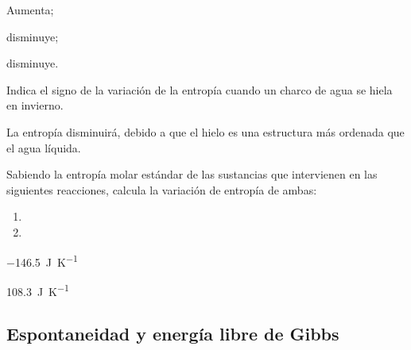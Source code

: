   \begin{solution}
    \begin{enumerate*}
      \item Aumenta;
      \item disminuye;
      \item disminuye.
    \end{enumerate*}
  \end{solution}



  \begin{exercise}[
      tags    = {termodinámica, entropía},
      topics  = {química, termoquímica, termodinámica},
      source  = {},
    ]
    Indica el signo de la variación de la entropía cuando un charco de agua se hiela en invierno.
  \end{exercise}

  \begin{solution}
    La entropía disminuirá, debido a que el hielo es una estructura más ordenada que el agua líquida.
  \end{solution}




  \begin{exercise}[
      tags    = {termodinámica, entropía},
      topics  = {química, termoquímica, termodinámica},
      source  = {},
    ]
    Sabiendo la entropía molar estándar de las sustancias que intervienen en las siguientes reacciones, calcula la variación de entropía de ambas:
    \begin{enumerate}
      \item {}
      \item {}
    \end{enumerate}
  \end{exercise}

  \begin{solution}
    \begin{enumerate*}
      \item \SI{-146.5}{\joule\per\kelvin}
      \item \SI{108.3}{\joule\per\kelvin}
    \end{enumerate*}
  \end{solution}




  \subsection*{Espontaneidad y energía libre de Gibbs}

